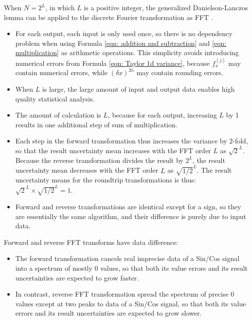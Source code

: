 \documentclass[twoside]{article}
\numberwithin{equation}{section}
\begin{document}
When $N = 2^{L}$, in which $L$ is a positive integer, the generalized Danielson-Lanczos lemma \cite{Numerical_Recipes} can be applied to the discrete Fourier transformation as FFT \cite{Numerical_Recipes}. 
\begin{itemize}

\item For each output, each input is only used once, so there is no dependency problem when using Formula \eqref{eqn: addition and subtraction} and \eqref{eqn: multiplication} as arithmetic operations.
This simplicity avoids introducing numerical errors from Formula \eqref{eqn: Taylor 1d variance}, because $f^{(j)}_x$ may contain numerical errors, while $(\delta x)^{2n}$ may contain rounding errors.

\item When $L$ is large, the large amount of input and output data enables high quality statistical analysis.

\item The amount of calculation is $L$, because for each output, increasing $L$ by 1 results in one additional step of sum of multiplication.

\item Each step in the forward transformation thus increases the variance by $2$-fold, so that the result uncertainty mean increases with the FFT order $L$ as $\sqrt{2}^L$.
Because the reverse transformation divides the result by $2^L$, the result uncertainty mean decreases with the FFT order $L$ as $\sqrt{1/2}^L$.
The result uncertainty means for the roundtrip transformations is thus: $\sqrt{2}^L \times \sqrt{1/2}^L = 1$.

\item Forward and reverse transformations are identical except for a sign, so they are essentially the same algorithm, and their difference is purely due to input data.  

\end{itemize}

Forward and reverse FFT transforms have data difference:
\begin{itemize}
\item The forward transformation cancels real imprecise data of a Sin/Cos signal into a spectrum of mostly $0$ values, so that both its value errors and its result uncertainties are expected to grow faster. 

\item In contrast, reverse FFT transformation spread the spectrum of precise $0$ values except at two peaks to data of a Sin/Cos signal, so that both its value errors and its result uncertainties are expected to grow slower. 
\end{itemize}
\end{document}
